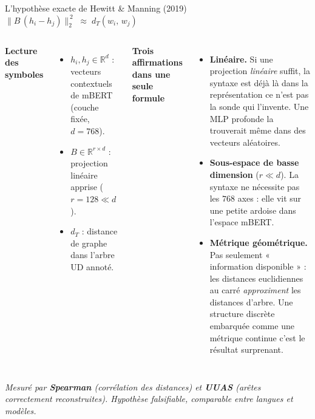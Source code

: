 \documentclass[aspectratio=169,11pt]{beamer}
\newcommand{\mbert}{m\textsc{BERT}\xspace}
\begin{document}
\begin{frame}{L'hypoth\`ese exacte de Hewitt \& Manning (2019)}
  \vspace{0.3cm}
  \centering
  {\Large $\displaystyle \bigl\| B\,(h_i - h_j) \bigr\|_2^{\,2}
   \;\approx\; d_T(w_i,\, w_j)$}

  \vspace{0.7cm}
  \begin{columns}[T]
    {\footnotesize
    \textbf{Lecture des symboles}\\[6pt]
    \begin{itemize}\setlength\itemsep{4pt}
      \item $h_i, h_j \in \mathbb{R}^d$ : vecteurs contextuels de
            \mbert{} (couche fix\'ee, $d{=}768$).
      \item $B \in \mathbb{R}^{r \times d}$ : projection
            \alert{lin\'eaire} apprise ($r{=}128 \ll d$).
      \item $d_T$ : distance de graphe dans l'arbre UD annot\'e.
    \end{itemize}}

    {\footnotesize
    \textbf{Trois affirmations dans une seule formule}\\[6pt]
    \begin{itemize}\setlength\itemsep{6pt}
      \item \textbf{Lin\'eaire.}
            Si une projection \emph{lin\'eaire} suffit, la syntaxe est
            \alert{d\'ej\`a l\`a} dans la repr\'esentation \textemdash{}
            ce n'est pas la sonde qui l'invente. Une MLP profonde
            la trouverait m\^eme dans des vecteurs al\'eatoires.
      \item \textbf{Sous-espace de basse dimension} ($r \ll d$).
            La syntaxe ne n\'ecessite pas les $768$ axes : elle vit
            sur une petite ardoise dans l'espace \mbert{}.
      \item \textbf{M\'etrique g\'eom\'etrique.}
            Pas seulement « information disponible » : les
            distances euclidiennes au carr\'e \emph{approximent} les
            distances d'arbre. Une structure discr\`ete embarqu\'ee
            comme une m\'etrique continue \textemdash{}
            \alert{c'est le r\'esultat surprenant}.
    \end{itemize}}
  \end{columns}

  \vspace{0.4cm}
  \centering\footnotesize\color{midgray}\itshape
  Mesur\'e par \textbf{Spearman} (corr\'elation des distances) et
  \textbf{UUAS} (ar\^etes correctement reconstruites).
  Hypoth\`ese falsifiable, comparable entre langues et mod\`eles.
\end{frame}
\end{document}
